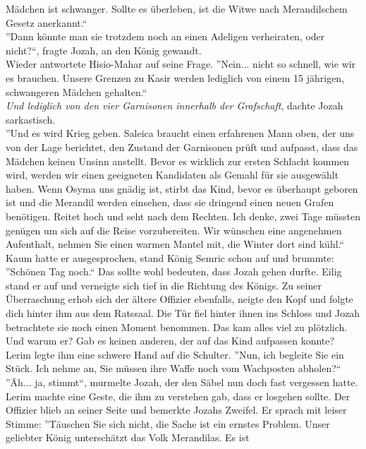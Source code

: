 Mädchen ist schwanger. Sollte es überleben, ist die Witwe nach Merandilschem Gesetz anerkannt.``\\
''Dann könnte man sie trotzdem noch an einen Adeligen verheiraten, oder nicht?``, fragte Jozah, an 
den König gewandt.\\
Wieder antwortete Hisio-Mahar auf seine Frage. ''Nein... nicht so schnell, wie wir es brauchen. 
Unsere Grenzen zu Kasir werden lediglich von einem 15 jährigen, schwangeren Mädchen gehalten.``\\
\textit{Und lediglich von den vier Garnisonen innerhalb der Grafschaft}, dachte Jozah sarkastisch.\\
''Und es wird Krieg geben. Saleica braucht einen erfahrenen Mann oben, der uns von der Lage 
berichtet, den Zustand der Garnisonen prüft und aufpasst, dass das Mädchen keinen Unsinn anstellt. 
Bevor es wirklich zur ersten Schlacht kommen wird, werden wir einen geeigneten Kandidaten als 
Gemahl für sie ausgewählt haben. Wenn Osyma uns gnädig ist, stirbt das Kind, bevor es überhaupt 
geboren ist und die Merandil werden einsehen, dass sie dringend einen neuen Grafen benötigen. 
Reitet hoch und seht nach dem Rechten. Ich denke, zwei Tage müssten genügen um sich auf die Reise 
vorzubereiten. Wir wünschen eine angenehmen Aufenthalt, nehmen Sie einen warmen Mantel mit, die 
Winter dort sind kühl.``\\
Kaum hatte er ausgesprochen, stand König Semric schon auf und brummte: ''Schönen Tag noch.``
Das sollte wohl bedeuten, dass Jozah gehen durfte. Eilig stand er auf und verneigte sich tief in 
die Richtung des Königs. Zu seiner Überraschung erhob sich der ältere Offizier ebenfalls, neigte 
den Kopf und folgte dich hinter ihm aus dem Ratssaal. Die Tür fiel hinter ihnen ins Schloss und 
Jozah betrachtete sie noch einen Moment benommen. Das kam alles viel zu plötzlich. Und warum er? 
Gab es keinen anderen, der auf das Kind aufpassen konnte?\\
Lerim legte ihm eine schwere Hand auf die Schulter. ''Nun, ich begleite Sie ein Stück. Ich nehme 
an, Sie müssen ihre Waffe noch vom Wachposten abholen?``\\
''Äh... ja, stimmt``, murmelte Jozah, der den Säbel nun doch fast vergessen hatte.\\
Lerim machte eine Geste, die ihm zu verstehen gab, dass er losgehen sollte. Der Offizier blieb an 
seiner Seite und bemerkte Jozahs Zweifel. Er sprach mit leiser Stimme: ''Täuschen Sie sich nicht, 
die Sache ist ein ernstes Problem. Unser geliebter König unterschätzt das Volk Merandilas. Es ist 
